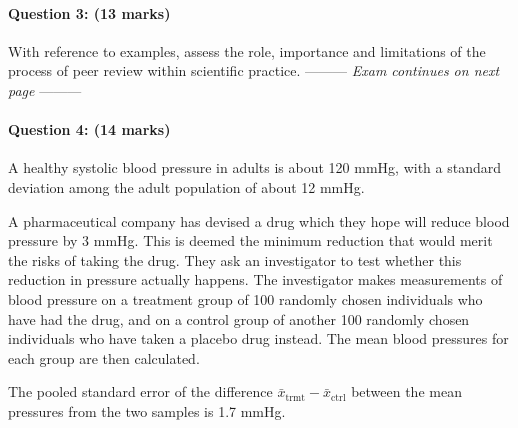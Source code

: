 \documentclass[a4paper,12pt,fleqn]{article}
\newcommand{\middlewords}{Exam continues on next page}
\begin{document}
\newpage

\paragraph{\textbf{Question 3: (13 marks)}}
With reference to examples, assess the role, importance and limitations of the process of peer review within scientific practice.
\vspace{3cm}
--------- \textit{\middlewords} ---------

\newpage

\paragraph{\textbf{Question 4: (14 marks)}}
A healthy systolic blood pressure in adults is about 120 mmHg, with a standard deviation among the adult population of about 12 mmHg. 

A pharmaceutical company has devised a drug which they hope will reduce blood pressure by 3 mmHg. This is deemed the minimum reduction that would merit the risks of taking the drug. They ask an investigator to test whether this reduction in pressure actually happens. The investigator makes measurements of blood pressure on a treatment group of 100 randomly chosen individuals who have had the drug, and on a control group of another 100 randomly chosen individuals who have taken a placebo drug instead.  The mean blood pressures for each group are then calculated.

The pooled standard error of the difference  $\bar{x}_\text{trmt}-\bar{x}_\text{ctrl}$ between the mean pressures from the two samples is 1.7 mmHg.
\end{document}
